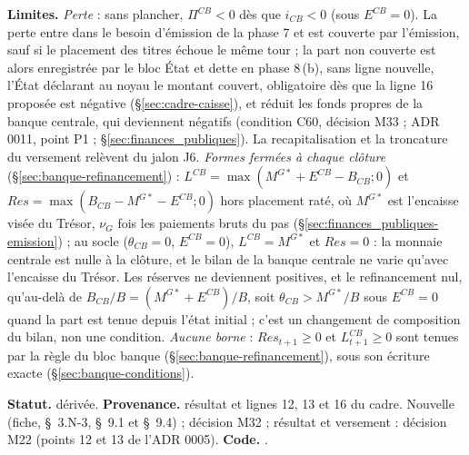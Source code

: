 \documentclass[11pt,a4paper]{article}
\newcommand{\limites}{\par\noindent\textbf{Limites.} }
\newcommand{\code}[1]{\texttt{\detokenize{#1}}}
\newcommand{\tracabilite}[3]{\par\smallskip\noindent\textbf{Statut.} #1. \textbf{Provenance.} #2. \textbf{Code.} \code{#3}.}
\begin{document}
\begin{proposee}
\begin{lecture}
\limites \emph{Perte} : sans plancher, $\Pi^{\mathit{CB}} < 0$ dès que $i_{\mathit{CB}} < 0$ (sous $E^{\mathit{CB}} = 0$). La perte entre dans le besoin d'émission de la phase 7 et est couverte par l'émission, sauf si le placement des titres échoue le même tour ; la part non couverte est alors enregistrée par le bloc État et dette en phase 8\,(b), sans ligne nouvelle, l'État déclarant au noyau le montant couvert, obligatoire dès que la ligne 16 proposée est négative (\S\ref{sec:cadre-caisse}), et réduit les fonds propres de la banque centrale, qui deviennent négatifs (condition C60, décision M33 ; ADR 0011, point P1 ; \S\ref{sec:finances_publiques}). La recapitalisation et la troncature du versement relèvent du jalon J6. \emph{Formes fermées à chaque clôture} (\S\ref{sec:banque-refinancement}) : $L^{\mathit{CB}} = \max(M^{G*} + E^{\mathit{CB}} - B_{\mathit{CB}} ; 0)$ et $\mathit{Res} = \max(B_{\mathit{CB}} - M^{G*} - E^{\mathit{CB}} ; 0)$ hors placement raté, où $M^{G*}$ est l'encaisse visée du Trésor, $\nu_G$ fois les paiements bruts du pas (\S\ref{sec:finances_publiques-emission}) ; au socle ($\theta_{\mathit{CB}} = 0$, $E^{\mathit{CB}} = 0$), $L^{\mathit{CB}} = M^{G*}$ et $\mathit{Res} = 0$ : la monnaie centrale est nulle à la clôture, et le bilan de la banque centrale ne varie qu'avec l'encaisse du Trésor. Les réserves ne deviennent positives, et le refinancement nul, qu'au-delà de $B_{\mathit{CB}}/B = (M^{G*} + E^{\mathit{CB}})/B$, soit $\theta_{\mathit{CB}} > M^{G*}/B$ sous $E^{\mathit{CB}} = 0$ quand la part est tenue depuis l'état initial ; c'est un changement de composition du bilan, non une condition. \emph{Aucune borne} : $\mathit{Res}_{t+1} \ge 0$ et $L^{\mathit{CB}}_{t+1} \ge 0$ sont tenues par la règle du bloc banque (\S\ref{sec:banque-refinancement}), sous son écriture exacte (\S\ref{sec:banque-conditions}).
\tracabilite{dérivée}{résultat et lignes 12, 13 et 16 du cadre. Nouvelle (fiche, \S~3.N-3, \S~9.1 et \S~9.4) ; décision M32 ; résultat et versement : décision M22 (points 12 et 13 de l'ADR 0005)}{nations.blocs.banque_centrale}
\end{lecture}
\end{proposee}
\end{document}
